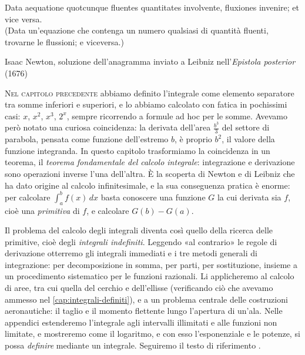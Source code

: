 
\epigraph{Data aequatione quotcunque fluentes quantitates involvente, fluxiones
invenire; et vice versa.\\[2pt]
\upshape(Data un'equazione che contenga un numero qualsiasi di quantità fluenti,
trovarne le flussioni; e viceversa.)}{Isaac Newton, soluzione dell'anagramma inviato a
Leibniz nell'\emph{Epistola posterior} (1676)}

\lettrine[lines=3, findent=2pt, nindent=0pt]{N}{el capitolo precedente} abbiamo
definito l'integrale come elemento separatore tra somme inferiori e superiori, e lo
abbiamo calcolato con fatica in pochissimi casi: $x$, $x^{2}$, $x^{3}$, $2^{x}$, sempre
ricorrendo a formule ad hoc per le somme. Avevamo però notato una curiosa
coincidenza: la derivata dell'area $\frac{b^{3}}3$ del settore di parabola, pensata
come funzione dell'estremo $b$, è proprio $b^{2}$, il valore della funzione integranda.
In questo capitolo trasformiamo la coincidenza in un teorema, il \emph{teorema
fondamentale del calcolo integrale}: integrazione e derivazione sono operazioni
inverse l'una dell'altra. È la scoperta di Newton e di Leibniz che ha dato origine al
calcolo infinitesimale, e la sua conseguenza pratica è enorme: per calcolare
$\int_{a}^{b}f(x)\,dx$ basta conoscere una funzione $G$ la cui derivata sia $f$, cioè
una \emph{primitiva} di $f$, e calcolare $G(b)-G(a)$.

Il problema del calcolo degli integrali diventa così quello della ricerca delle
primitive, cioè degli \emph{integrali indefiniti}. Leggendo «al contrario» le regole di
derivazione otterremo gli integrali immediati e i tre metodi generali di integrazione:
per decomposizione in somma, per parti, per sostituzione, insieme a un procedimento
sistematico per le funzioni razionali. Li applicheremo al calcolo di aree, tra cui
quella del cerchio e dell'ellisse (verificando ciò che avevamo ammesso nel
\cref{cap:integrali-definiti}), e a un problema centrale delle costruzioni aeronautiche:
il taglio e il momento flettente lungo l'apertura di un'ala. Nelle appendici
estenderemo l'integrale agli intervalli illimitati e alle funzioni non limitate, e
mostreremo come il logaritmo, e con esso l'esponenziale e le potenze, si possa
\emph{definire} mediante un integrale. Seguiremo il testo di riferimento
\cite{marcellini-sbordone}.

